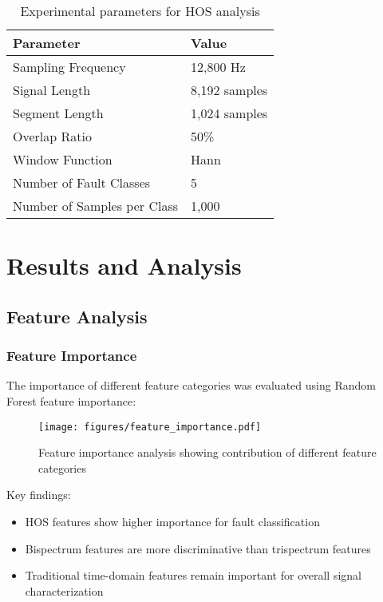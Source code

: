 \begin{table}[H]
\centering
\caption{Experimental parameters for HOS analysis}
\label{tab:experimental_params}
\begin{tabular}{@{}ll@{}}
\toprule
Parameter & Value \\
\midrule
Sampling Frequency & 12,800 Hz \\
Signal Length & 8,192 samples \\
Segment Length & 1,024 samples \\
Overlap Ratio & 50\% \\
Window Function & Hann \\
Number of Fault Classes & 5 \\
Number of Samples per Class & 1,000 \\
\bottomrule
\end{tabular}
\end{table}

\section{Results and Analysis}

\subsection{Feature Analysis}

\subsubsection{Feature Importance}

The importance of different feature categories was evaluated using Random Forest feature importance:

\begin{figure}[H]
\centering
\texttt{[image: figures/feature\_importance.pdf]}
\caption{Feature importance analysis showing contribution of different feature categories}
\label{fig:feature_importance}
\end{figure}

Key findings:
\begin{itemize}
    \item HOS features show higher importance for fault classification
    \item Bispectrum features are more discriminative than trispectrum features
    \item Traditional time-domain features remain important for overall signal characterization
\end{itemize}

